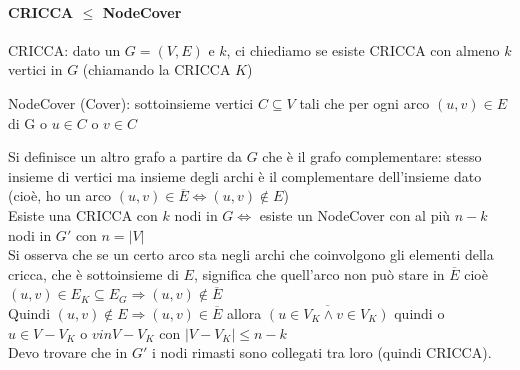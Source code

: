 \documentclass[10pt]{book}
\begin{document}
\paragraph{CRICCA $\leq$ NodeCover}
\begin{list}{}{}
	\item CRICCA: dato un $G=(V,E)$ e $k$, ci chiediamo se esiste CRICCA con almeno $k$ vertici in $G$ (chiamando la CRICCA $K$)
	\item NodeCover (Cover): sottoinsieme vertici $C\subseteq V$ tali che per ogni arco $(u,v)\in E$ di G o $u\in C$ o $v\in C$
\end{list}
Si definisce un altro grafo a partire da $G$ che è il grafo complementare: stesso insieme di vertici ma insieme degli archi è il complementare dell'insieme dato (cioè, ho un arco $(u,v)\in \overline{E} \Leftrightarrow (u,v)\not\in E$)\\
Esiste una CRICCA con $k$ nodi in $G \Leftrightarrow$ esiste un NodeCover con al più $n-k$ nodi in $G'$ con $n = |V|$\\
Si osserva che se un certo arco sta negli archi che coinvolgono gli elementi della cricca, che è sottoinsieme di $E$, significa che quell'arco non può stare in $\overline{E}$ cioè $(u,v)\in E_K\subseteq E_G \Rightarrow (u,v)\not\in \overline{E}$\\
Quindi $(u,v)\not\in E \Rightarrow (u,v)\in \overline{E}$ allora $\overline{(u\in V_K \wedge v \in V_K)}$ quindi o $u \in V - V_K$ o $v in V - V_K$ con $|V-V_K|\leq n-k$\\
Devo trovare che in $G'$ i nodi rimasti sono collegati tra loro (quindi CRICCA).
\end{document}
